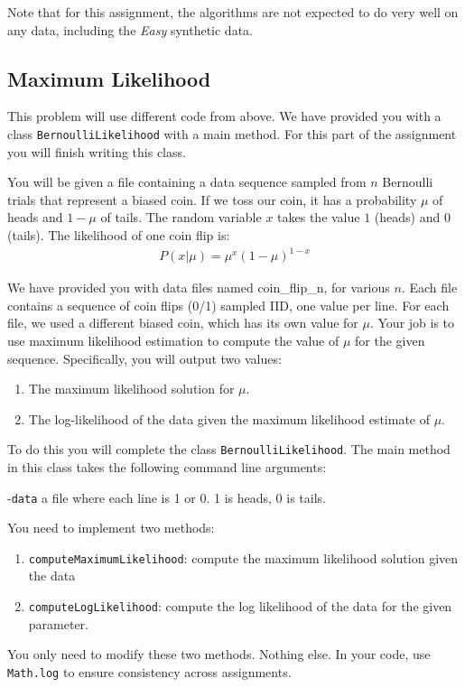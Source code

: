 \documentclass[11pt]{article}
\begin{document}
Note that for this assignment, the algorithms are not expected to do very well on any data, including the \emph{Easy} synthetic data.

\subsection{Maximum Likelihood}
This problem will use different code from above. We have provided you with a class {\tt BernoulliLikelihood} with a main method. For this part of the assignment you
will finish writing this class.

You will be given a file containing a data sequence sampled from $n$ Bernoulli trials that represent a biased coin. If we toss our coin, it has a probability $\mu$ of heads and $1-\mu$ of tails. The random variable $x$ takes the value $1$ (heads) and $0$ (tails). The likelihood of one coin flip is:
\begin{eqnarray}
P(x|\mu) = \mu^x (1-\mu)^{1-x}
\end{eqnarray}

We have provided you with data files named coin\_flip\_n, for various $n$. Each file contains a sequence of coin flips (0/1) sampled IID, one value per line. For each file, we used
a different biased coin, which has its own value for $\mu$. Your job is to use maximum likelihood estimation to compute the value of $\mu$ for the given sequence.
Specifically, you will output two values:
\begin{enumerate}
\item The maximum likelihood solution for $\mu$.
\item The log-likelihood of the data given the maximum likelihood estimate of $\mu$.
\end{enumerate}

To do this you will complete the class {\tt BernoulliLikelihood}. The main method in this class takes the following command line arguments:

-{\tt data} a file where each line is 1 or 0. 1 is heads, 0 is tails.

You need to implement two methods:
\begin{enumerate}
\item {\tt computeMaximumLikelihood}: compute the maximum likelihood solution given the data
\item {\tt computeLogLikelihood}: compute the log likelihood of the data for the given parameter.
\end{enumerate}

You only need to modify these two methods. Nothing else. In your code, use {\tt Math.log} to ensure consistency across
assignments.
\end{document}
